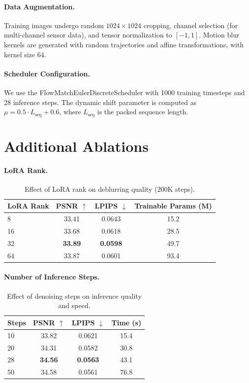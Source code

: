 \documentclass{article}
\begin{document}
\paragraph{Data Augmentation.}
Training images undergo random $1024 \times 1024$ cropping, channel selection (for multi-channel sensor data), and tensor normalization to $[-1, 1]$. Motion blur kernels are generated with random trajectories and affine transformations, with kernel size 64.

\paragraph{Scheduler Configuration.}
We use the FlowMatchEulerDiscreteScheduler with 1000 training timesteps and 28 inference steps. The dynamic shift parameter is computed as $\mu = 0.5 \cdot L_{\text{seq}} + 0.6$, where $L_{\text{seq}}$ is the packed sequence length.

\section{Additional Ablations}
\label{app:ablations}

\paragraph{LoRA Rank.}
\begin{table}[h]
\centering
\caption{Effect of LoRA rank on deblurring quality (200K steps).}
\vspace{0.5em}
\begin{tabular}{@{}lccc@{}}
\toprule
LoRA Rank & PSNR $\uparrow$ & LPIPS $\downarrow$ & Trainable Params (M) \\
\midrule
8 & 33.41 & 0.0643 & 15.2 \\
16 & 33.68 & 0.0618 & 28.5 \\
32 & \textbf{33.89} & \textbf{0.0598} & 49.7 \\
64 & 33.87 & 0.0601 & 93.4 \\
\bottomrule
\end{tabular}
\end{table}

\paragraph{Number of Inference Steps.}
\begin{table}[h]
\centering
\caption{Effect of denoising steps on inference quality and speed.}
\vspace{0.5em}
\begin{tabular}{@{}lccc@{}}
\toprule
Steps & PSNR $\uparrow$ & LPIPS $\downarrow$ & Time (s) \\
\midrule
10 & 33.82 & 0.0621 & 15.4 \\
20 & 34.31 & 0.0582 & 30.8 \\
28 & \textbf{34.56} & \textbf{0.0563} & 43.1 \\
50 & 34.58 & 0.0561 & 76.8 \\
\bottomrule
\end{tabular}
\end{table}
\end{document}
